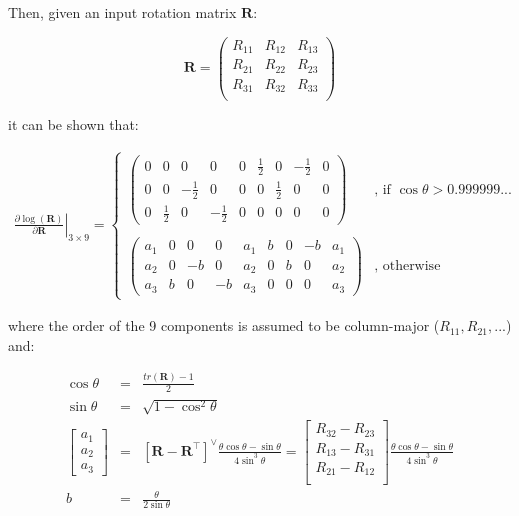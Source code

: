 \documentclass[a4paper,11pt]{report}
\begin{document}
Then, given an input rotation matrix $\mathbf{R}$:

\begin{equation}
\mathbf{R} = \left(
\begin{array}{ccc}
 R_{11} & R_{12} & R_{13} \\
 R_{21} & R_{22} & R_{23} \\
 R_{31} & R_{32} & R_{33} \\
\end{array}
\right)
\nonumber
\end{equation}

\noindent it can be shown that:

\begin{eqnarray}
\left.
 \frac{\partial \log(\mathbf{R}) }{\partial \mathbf{R}}
\right|_{3\times 9}
 =
\left\{
\begin{array}{ll}
  \left(
  \begin{array}{ccc|ccc|ccc}
   0  & 0 &  0  & 0 & 0 & \frac{1}{2} & 0 & -\frac{1}{2} & 0   \\
   0  & 0 &  -\frac{1}{2}  & 0 & 0 & 0 & \frac{1}{2} & 0 & 0   \\
   0  & \frac{1}{2} &  0 & -\frac{1}{2} & 0 & 0 & 0 & 0 & 0
  \end{array}
  \right)
 &
\text{, if $\cos\theta > 0.999999...$} \\
~\\
  \left(
  \begin{array}{ccc|ccc|ccc}
   a_1  & 0 &  0  & 0 & a_1 & b & 0 & -b & a_1   \\
   a_2  & 0 & -b  & 0 & a_2 & 0 & b & 0 & a_2   \\
   a_3  & b &  0 & -b & a_3 & 0 & 0 & 0 & a_3
  \end{array}
  \right)
 &
\text{, otherwise}
\end{array}
\right.
\end{eqnarray}

\noindent where the order of the 9 components is assumed to be column-major ($R_{11},R_{21},...$) and:

\begin{eqnarray}
\cos \theta &=& \frac{tr(\mathbf{R})-1}{2}  \nonumber \\
\sin \theta &=& \sqrt{1-\cos^2 \theta}  \nonumber \\
\left[
\begin{array}{c}
 a_1 \\ a_2 \\ a_3
\end{array}
\right]
 &=& \left[ \mathbf{R} - \mathbf{R}^\top \right]^\vee
\frac{\theta \cos\theta  -\sin \theta  }{4 \sin^3 \theta}
 = \left[
\begin{array}{c}
 R_{32} - R_{23} \\
 R_{13} - R_{31} \\
 R_{21} - R_{12} \\
\end{array}
 \right]
\frac{\theta \cos\theta  -\sin \theta  }{4 \sin^3 \theta}
\nonumber \\
b &=& \frac{\theta}{2 \sin \theta}
\nonumber
\end{eqnarray}
\end{document}
